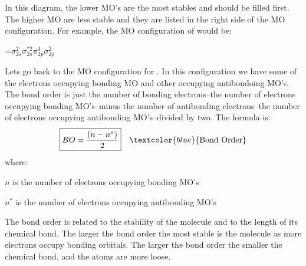 \documentclass[main.tex]{subfiles}
\begin{document}
\begin{description}
\begin{center}
\end{center}

In this diagram, the lower MO's are the most stables and should be filled first. The higher MO are less stable and they are listed in the right side of the MO configuration. For example, the MO configuration of  would be:
\begin{center}=$\sigma^{2}_{2s}\sigma^{*2}_{2s}\pi^{4}_{2p}\sigma^{2}_{2p}$\end{center}


\item[\docfilehook{Bond order of a MO configuration}{Bond order of a MO configuration}] Lets go back to the MO configuration for . In this configuration we have some of the electrons occupying bonding MO and other occupying antibondoing MO's. The bond order is just the number of bonding electrons--the number of electrons occupying bonding MO's--minus the number of antibonding electrons--the number of electrons occupying antibonding MO's--divided by two. The formula is:
\begin{equation*}
\boxed{  BO=\frac{(n-n^*)}{2}  } \quad \textcolor{blue}{\text{Bond Order}}
\end{equation*}
where:
\begin{where}
 \item $n$   is the number of electrons occupying bonding MO's
  \item $n^*$ is the number of electrons occupying antibonding MO's
\end{where}
The bond order is related to the stability of the molecule and to the length of its chemical bond. The larger the bond order the most stable is the molecule as more electrons occupy bonding orbitals. The larger the bond order the smaller the chemical bond, and the atoms are more loose.


\end{description}
\end{document}
